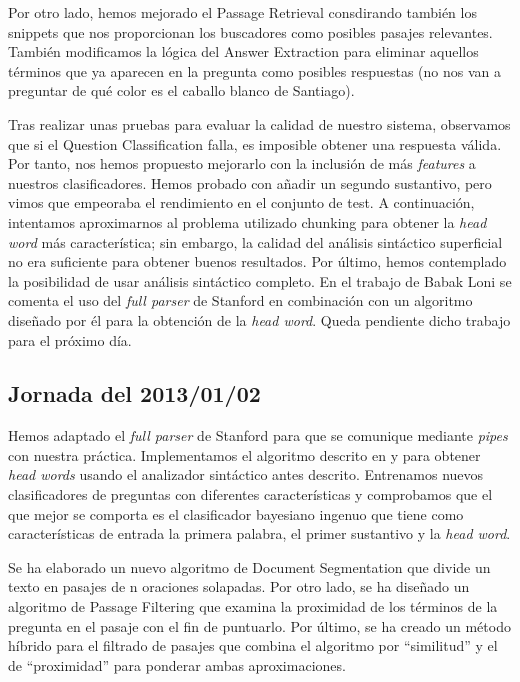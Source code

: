\documentclass[12pt,a4paper,titlepage]{article}
\begin{document}
Por otro lado, hemos mejorado el Passage Retrieval consdirando también los snippets que nos proporcionan los buscadores como posibles pasajes relevantes. También modificamos la lógica del Answer Extraction para eliminar aquellos términos que ya aparecen en la pregunta como posibles respuestas (no nos van a preguntar de qué color es el caballo blanco de Santiago).

Tras realizar unas pruebas para evaluar la calidad de nuestro sistema, observamos que si el Question Classification falla, es imposible obtener una respuesta válida. Por tanto, nos hemos propuesto mejorarlo con la inclusión de más \emph{features} a nuestros clasificadores. Hemos probado con añadir un segundo sustantivo, pero vimos que empeoraba el rendimiento en el conjunto de test. A continuación, intentamos aproximarnos al problema utilizado chunking para obtener la \emph{head word} más característica; sin embargo, la calidad del análisis sintáctico superficial no era suficiente para obtener buenos resultados. Por último, hemos contemplado la posibilidad de usar análisis sintáctico completo. En el trabajo de Babak Loni \cite{tesis:qc} se comenta el uso del \emph{full parser} de Stanford en combinación con un algoritmo diseñado por él para la obtención de la \emph{head word}. Queda pendiente dicho trabajo para el próximo día.

\subsection{Jornada del 2013/01/02}
Hemos adaptado el \emph{full parser} de Stanford para que se comunique mediante \emph{pipes} con nuestra práctica. Implementamos el algoritmo descrito en \cite{tesis:qc} y \cite{paper:qc} para obtener \emph{head words} usando el analizador sintáctico antes descrito. Entrenamos nuevos clasificadores de preguntas con diferentes características y comprobamos que el que mejor se comporta es el clasificador bayesiano ingenuo que tiene como características de entrada la primera palabra, el primer sustantivo y la \emph{head word}.

Se ha elaborado un nuevo algoritmo de Document Segmentation que divide un texto en pasajes de n oraciones solapadas. Por otro lado, se ha diseñado un algoritmo de Passage Filtering que examina la proximidad de los términos de la pregunta en el pasaje con el fin de puntuarlo. Por último, se ha creado un método híbrido para el filtrado de pasajes que combina el algoritmo por ``similitud'' y el de ``proximidad'' para ponderar ambas aproximaciones.
\end{document}
